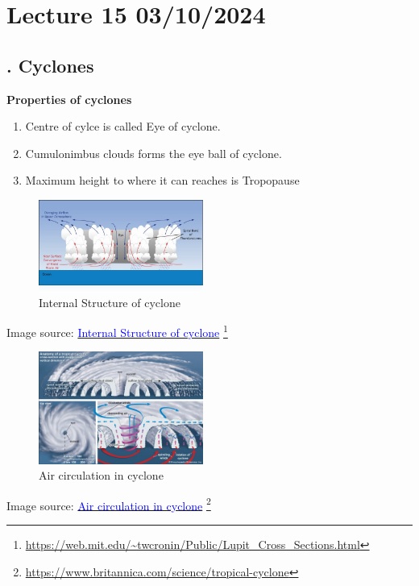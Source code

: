 \documentclass[fleqn,10pt]{SelfArx} %
\newcommand{\myhref}[2]{%
  \href{#1}{\textcolor{blue}{#2}}%
  \footnote{\url{#1}}%
}
\begin{document}
\clearpage

\section{Lecture 15 03/10/2024}

\subsection{. Cyclones}
\textbf{Properties of cyclones}
\begin{enumerate}[noitemsep]
    \item Centre of cylce is called Eye of cyclone.
    \item Cumulonimbus clouds forms the eye ball of cyclone.
    \item Maximum height to where it can reaches is Tropopause
\end{enumerate}
\begin{figure}[ht]
    \begin{center}
        \includegraphics[width=0.48\textwidth]{Figures/hurricane_structure.jpg}
    \end{center}
    \caption{Internal Structure of cyclone}\label{fig:cyclone_structure}
\end{figure}
Image source: \myhref{https://web.mit.edu/~twcronin/Public/Lupit_Cross_Sections.html}{Internal Structure of cyclone}

\begin{figure}[ht]
    \begin{center}
        \includegraphics[width=0.48\textwidth]{Figures/cyclone_air_circulation.png}
    \end{center}
    \caption{ Air circulation in cyclone}\label{fig:cyclone_air_circulation}
\end{figure}
Image source: \myhref{https://www.britannica.com/science/tropical-cyclone}{ Air circulation in cyclone}
\end{document}
